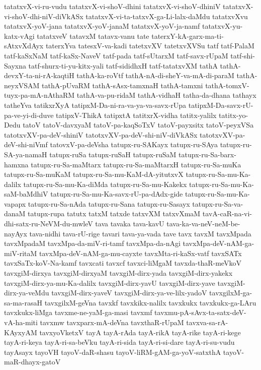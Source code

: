 {tatatxvX-vi-ru-vudu
tatatxvX-vi-shoV-dhini
tatatxvX-vi-shoV-dhiniV
tatatxvX-vi-shoV-dhi-niV-diVkASx
tatatxvX-vi-ta-tatxvX-ga-Li-lalx-daMdu
tatatxvXvu
tatatxvX-yoV-jana
tatatxvX-yoV-janaM
tatatxvX-yoV-ja-namf
tatatxvX-yu-katx-vAgi
tatatxveV
tatavxM
tatavx-vanu
tate
taterxY-kA-garx-ma-ti-sAtxvXdAyx
taterxYva
tatesxV-va-kadi
tatetxvXV
tatetxvXVSu
tatf
tatf-PalaM
tatf-kaSxNaM
tatf-kaSx-NaveV
tatf-pada
tatf-sUtarxM
tatf-savx-rUpaM
tatf-shi-Sayxna
tatf-shurx-ti-yu-kitx-yali
tatf-sididhxH
tatf-tatatxvXM
tathA
tathA-devxY-ta-ni-rA-kaqtiH
tathA-ka-roVtf
tathA-nA-di-sheY-va-mA-di-paraM
tathA-neyxVSAM
tathA-pUvaRM
tathA-sAsx-tamxnaH
tathA-tamxni
tathA-tomxV-tuyx-pa-mA-nAthaRM
tathA-va-pu-ridaM
tathA-vidhaH
tatha-da-dhana
tathayx
tatheYva
tatikxrXyA
tatipxM-Da-ni-ra-va-ya-va-savx-rUpa
tatipxM-Da-savx-rU-pa-ve-yi-di-duve
tatipxV-ThikA
tatipxtA
tatitxrX-vidha
tatitx-yalilx
tatitx-yo-Dedu
tatoV
tatoV-davxyaM
tatoV-pa-kaqSoTxV
tatoV-payxsitx
tatoV-peyxVSa
tatotxvXV-pa-deV-shiniV
tatotxvXV-pa-deV-shi-niV-diVkASx
tatotxvXV-pa-deV-shi-niVmf
tatovxV-pa-deVsha
tatupx-ru-SAKayx
tatupx-ru-SAya
tatupx-ru-SA-ya-namaH
tatupx-ruSa
tatupx-ruSaH
tatupx-ruSaM
tatupx-ru-Sa-barx-hamxna
tatupx-ru-Sa-maMtarx
tatupx-ru-Sa-maMtarxH
tatupx-ru-Sa-muKa
tatupx-ru-Sa-muKaM
tatupx-ru-Sa-mu-KaM-dA-yitutxvX
tatupx-ru-Sa-mu-Ka-dalilx
tatupx-ru-Sa-mu-Ka-diMda
tatupx-ru-Sa-mu-Kakekx
tatupx-ru-Sa-mu-Ka-saM-baMdhiV
tatupx-ru-Sa-mu-Ka-savx-rU-pa-dAdx-gide
tatupx-ru-Sa-mu-Ka-vapapx
tatupx-ru-Sa-nAda
tatupx-ru-Sana
tatupx-ru-Sasayx
tatupx-ru-Sa-va-danaM
tatupx-rupa
tatutx
tatxM
tatxde
tatxvXM
tatxvXmaM
tavA-caR-na-vi-dhi-satx-ru-NeVM-du-mwleV
tava
tavaka
tava-kavU
tava-ka-va-neV-neM-be-nayAyx
tava-nidhi
tava-rU-rige
tavari
tava-ya-vada
tave
tavx
tavxM
tavxMpada
tavxMpadaM
tavxMpa-da-miV-ri-tamf
tavxMpa-da-nAgi
tavxMpa-deV-nAM-ga-miV-ritaM
tavxMpa-deV-nAM-ga-mu-cayxte
tavxMta-ri-kaSx-vatf
tavxSATx
tavxSaTx-koV-Na-kamf
tavxcati
tavxcf
tavxci-liMgaM
tavxda-thaR-meVkoV
tavxgiM-dirxya
tavxgiM-dirxyaM
tavxgiM-dirx-yada
tavxgiM-dirx-yakekx
tavxgiM-dirx-ya-mu-Ka-dalilx
tavxgiM-dirx-yavU
tavxgiM-dirx-yave
tavxgiM-dirx-ya-veMdu
tavxgiM-dirx-yaveV
tavxgiM-dirx-ya-ve-lilx-yadoV
tavxgilxM-ga-sa-ma-rasaH
tavxgilxM-geVna
tavxkf
tavxkikx-nalilx
tavxkukx
tavxkukx-ga-LAru
tavxkukx-liMga
tavxme-ne-yaM-ga-masi
tavxmf
tavxmu-pA-sAvx-ta-satx-deV-vA-ha-miti
tavxmw
tavxparx-mA-deVna
tavxthaR-rUpaM
tavxva-sa-rA-KAyxyAM
tavxyoVketxV
tayA
tayA-rAda
tayA-rikA
tayA-rike
tayA-ri-kege
tayA-ri-keya
tayA-ri-sa-beVku
tayA-ri-sida
tayA-ri-si-dare
tayA-ri-su-vudu
tayAsayx
tayoVH
tayoV-daR-shasu
tayoV-liRM-gAM-ga-yoV-satxthA
tayoV-maR-dhayx-gatoV
}
